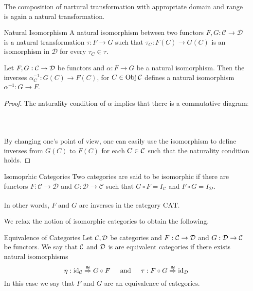 \documentclass[a4paper]{article}
\begin{document}
\begin{prp}{}{} The composition of nartural transformation with appropriate domain and range is again a natural transformation. 
\end{prp}

\begin{defn}{Natural Isomorphism}{} A natural isomorphism between two functors $F,G:\mathcal{C}\to\mathcal{D}$ is a natural transformation $\tau:F\to G$ such that $\tau_C:F(C)\to G(C)$ is an isomorphism in $\mathcal{D}$ for every $\tau_C\in\tau$. 
\end{defn}

\begin{lmm}{}{} Let $F,G:\mathcal{C}\to\mathcal{D}$ be functors and $\alpha:F\to G$ be a natural isomorphism. Then the inverses $\alpha^{-1}_C:G(C)\to F(C)$, for $C\in\operatorname{Obj}\mathcal{C}$ defines a natural isomorphism $\alpha^{-1}:G\to F$. \tcbline
\begin{proof}
The naturality condition of $\alpha$ implies that there is a commutative diagram: \\~\\
\\~\\
By changing one's point of view, one can easily use the isomorphism to define inverses from $G(C)$ to $F(C)$ for each $C\in\mathcal{C}$ such that the naturality condition holds. 
\end{proof}
\end{lmm}

\begin{defn}{Isomoprhic Categories}{} Two categories are said to be isomorphic if there are functors $F:\mathcal{C}\to\mathcal{D}$ and $G:\mathcal{D}\to\mathcal{C}$ such that $G\circ F=I_\mathcal{C}$ and $F\circ G=I_\mathcal{D}$. \\~\\
In other words, $F$ and $G$ are inverses in the category $\text{CAT}$. 
\end{defn}

We relax the notion of isomorphic categories to obtain the following. 

\begin{defn}{Equivalence of Categories}{} Let $\mathcal{C},\mathcal{D}$ be categories and $F:\mathcal{C}\to\mathcal{D}$ and $G:\mathcal{D}\to\mathcal{C}$ be functors. We say that $\mathcal{C}$ and $\mathcal{D}$ is are equivalent categories if there exists natural isomorphisms $$
\eta:\text{id}_{\mathcal{C}}\overset{\cong}{\Rightarrow}G\circ F\;\;\;\;\text{ and }\;\;\;\;
\tau:F\circ G\overset{\cong}{\Rightarrow}\text{id}_{\mathcal{D}}$$
In this case we say that $F$ and $G$ are an equivalence of categories. 
\end{defn}
\end{document}
